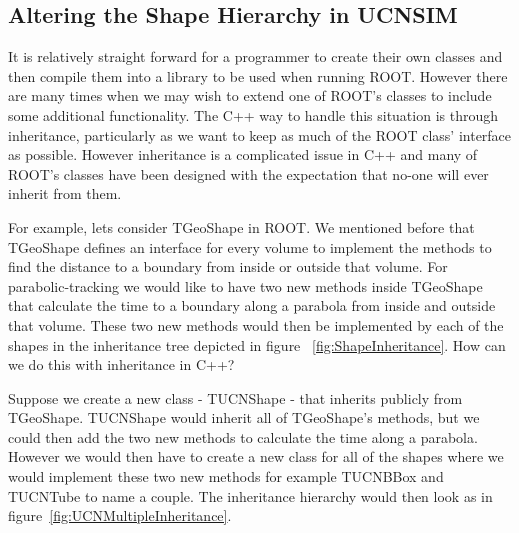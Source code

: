 \documentclass[11pt,a4paper,oneside]{article}
\begin{document}
\subsection{Altering the Shape Hierarchy in UCNSIM}

It is relatively straight forward for a programmer to create their own classes and then compile them into a library to be used when running ROOT. However there are many times when we may wish to extend one of ROOT's classes to include some additional functionality. The C++ way to handle this situation is through inheritance, particularly as we want to keep as much of the ROOT class' interface as possible. However inheritance is a complicated issue in C++ and many of ROOT's classes have been designed with the expectation that no-one will ever inherit from them.

For example, lets consider TGeoShape in ROOT. We mentioned before that TGeoShape defines an interface for every volume to implement the methods to find the distance to a boundary from inside or outside that volume. For parabolic-tracking we would like to have two new methods inside TGeoShape that calculate the time to a boundary along a parabola from inside and outside that volume. These two new methods would then be implemented by each of the shapes in the inheritance tree depicted in figure ~\ref{fig:ShapeInheritance}. How can we do this with inheritance in C++?

Suppose we create a new class - TUCNShape - that inherits publicly from TGeoShape. TUCNShape would inherit all of TGeoShape's methods, but we could then add the two new methods to calculate the time along a parabola. However we would then have to create a new class for all of the shapes where we would implement these two new methods for example TUCNBBox and TUCNTube to name a couple. The inheritance hierarchy would then look as in figure~\ref{fig:UCNMultipleInheritance}.
\end{document}
